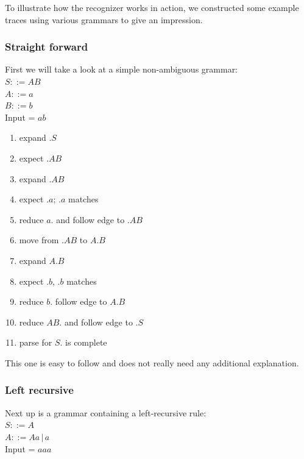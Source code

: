 \documentclass[a4paper,10pt]{article}
\begin{document}
To illustrate how the recognizer works in action, we constructed some example traces using various grammars to give an impression.

\pagebreak
\subsubsection{Straight forward}
First we will take a look at a simple non-ambiguous grammar:\\
$S ::= AB$\\
$A ::= a$\\
$B ::= b$\\
Input = $ab$

\begin{enumerate}
 \setlength{\itemsep}{0pt}
 \setlength{\parskip}{0pt}
 \setlength{\parsep}{0pt}
 
 \item expand $.S$
 \item expect $.AB$
 \item expand $.AB$
 \item expect $.a$; $.a$ matches
 \item reduce $a.$ and follow edge to $.AB$
 \item move from $.AB$ to $A.B$
 \item expand $A.B$
 \item expect $.b$, $.b$ matches
 \item reduce $b.$ follow edge to $A.B$
 \item reduce $AB.$ and follow edge to $.S$
 \item parse for $S.$ is complete 
\end{enumerate}
This one is easy to follow and does not really need any additional explanation.

\subsubsection{Left recursive}
\label{sec:tracesLeftRecusive}
Next up is a grammar containing a left-recursive rule:\\
$S ::= A$\\
$A ::= Aa\,|\,a$\\
Input = $aaa$
\end{document}
